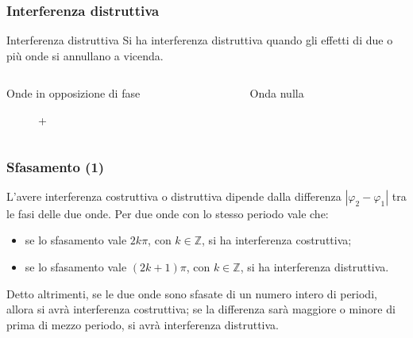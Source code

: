 \documentclass[]{beamer}
\theoremstyle{plain}
\begin{document}
\begin{frame}
  \frametitle{Interferenza distruttiva}
    \begin{block}{Interferenza distruttiva}
    Si ha interferenza distruttiva quando gli effetti di due o più onde si annullano a vicenda.
  \end{block}\pause
    \begin{columns}
\begin{column}{0.5\textwidth}
\begin{center}
Onde in opposizione di fase
\end{center}
\begin{figure}

+

\end{figure}

\end{column}
\begin{column}{0.5\textwidth}
\begin{center}
Onda nulla
\end{center}
\begin{figure}
\end{figure}

\end{column}
\end{columns}

\end{frame}

\begin{frame}
  \frametitle{Sfasamento (1)}
  L'avere interferenza costruttiva o distruttiva dipende dalla differenza $ |\varphi_2 - \varphi_1| $ tra le fasi delle due onde.{\pause} Per due onde con lo stesso periodo vale che:
  \begin{itemize}
    \item se lo sfasamento vale $ 2k\pi $, con $ k \in \mathbb{Z} $, si ha interferenza costruttiva;\pause
    \item se lo sfasamento vale $ (2k+1)\pi $, con $ k \in \mathbb{Z} $, si ha interferenza distruttiva.\pause
  \end{itemize}
  Detto altrimenti, se le due onde sono sfasate di un numero intero di periodi, allora si avrà interferenza costruttiva; se la differenza sarà maggiore o minore di prima di mezzo periodo, si avrà interferenza distruttiva.
\end{frame}
\end{document}
